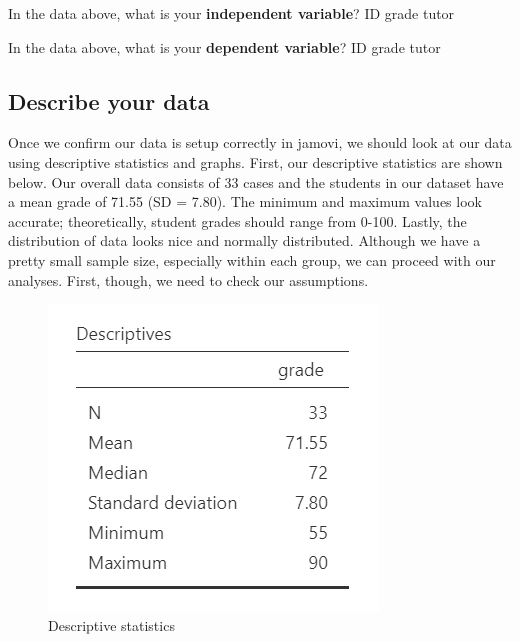 \documentclass[
]{book}
\begin{document}
In the data above, what is your \textbf{independent variable}? ID grade tutor

In the data above, what is your \textbf{dependent variable}? ID grade tutor

\hypertarget{describe-your-data}{%
\subsection{Describe your data}\label{describe-your-data}}

Once we confirm our data is setup correctly in jamovi, we should look at our data using descriptive statistics and graphs. First, our descriptive statistics are shown below. Our overall data consists of 33 cases and the students in our dataset have a mean grade of 71.55 (SD = 7.80). The minimum and maximum values look accurate; theoretically, student grades should range from 0-100. Lastly, the distribution of data looks nice and normally distributed. Although we have a pretty small sample size, especially within each group, we can proceed with our analyses. First, though, we need to check our assumptions.

\begin{figure}

{\centering \includegraphics[width=0.8\linewidth]{images/02-independent_t-test/independent_t-test_descriptives_all} 

}

\caption{Descriptive statistics}\label{fig:unnamed-chunk-2}
\end{figure}
\end{document}
